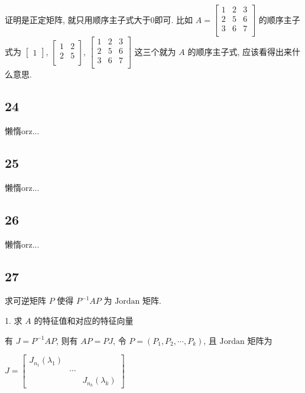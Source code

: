 \documentclass[a4paper, draft]{article}
\begin{document}
证明是正定矩阵, 就只用顺序主子式大于0即可. 比如 $A=\begin{bmatrix}
    1 & 2 & 3 \\
    2 & 5 & 6 \\
    3 & 6 & 7 \\
\end{bmatrix}$ 的顺序主子式为 $\begin{bmatrix}
    1
\end{bmatrix}$, $\begin{bmatrix}
    1 & 2 \\
    2 & 5 \\
\end{bmatrix}$, $\begin{bmatrix}
    1 & 2 & 3 \\
    2 & 5 & 6 \\
    3 & 6 & 7 \\
\end{bmatrix}$ 这三个就为 $A$ 的顺序主子式, 应该看得出来什么意思.

\subsection*{24}

懒惰orz...

\subsection*{25}

懒惰orz...

\subsection*{26}

懒惰orz...

\subsection*{27}

求可逆矩阵 $P$ 使得 $P^{-1}AP$ 为 $\text{Jordan}$ 矩阵.


1. 求 $A$ 的特征值和对应的特征向量

有 $J=P^{-1}AP$, 则有 $AP=PJ$, 令 $P=(P_1,P_2,\cdots,P_k)$, 且 $\text{Jordan}$ 矩阵为

$J=\begin{bmatrix}
J_{n_1}(\lambda_1)&&\\
&\cdots&\\
&&J_{n_k}(\lambda_k)
\end{bmatrix}$
\end{document}
